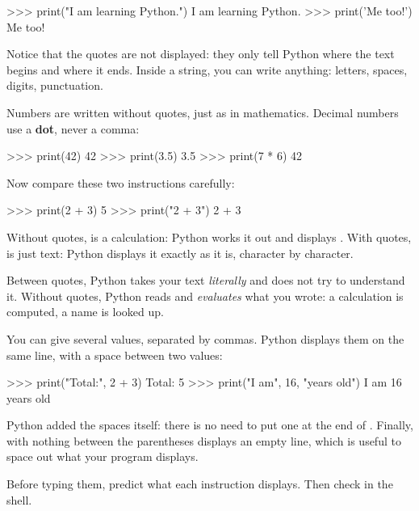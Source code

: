 \begin{console}
>>> print("I am learning Python.")
I am learning Python.
>>> print('Me too!')
Me too!
\end{console}

Notice that the quotes are not displayed: they only tell Python where the text begins and where it
ends. Inside a string, you can write anything: letters, spaces, digits, punctuation.

Numbers are written without quotes, just as in mathematics. Decimal numbers use a \textbf{dot},
never a comma:

\begin{console}
>>> print(42)
42
>>> print(3.5)
3.5
>>> print(7 * 6)
42
\end{console}

Now compare these two instructions carefully:

\begin{console}
>>> print(2 + 3)
5
>>> print("2 + 3")
2 + 3
\end{console}

Without quotes,  is a calculation: Python works it out and displays . With quotes,
 is just text: Python displays it exactly as it is, character by character.

\begin{regle}
Between quotes, Python takes your text \emph{literally} and does not try to understand it. Without
quotes, Python reads and \emph{evaluates} what you wrote: a calculation is computed, a name is looked
up.
\end{regle}

You can give  several values, separated by commas. Python displays them on the same
line, with a space between two values:

\begin{console}
>>> print("Total:", 2 + 3)
Total: 5
>>> print("I am", 16, "years old")
I am 16 years old
\end{console}

Python added the spaces itself: there is no need to put one at the end of . Finally,
 with nothing between the parentheses displays an empty line, which is useful to space
out what your program displays.

\begin{atoi}
Before typing them, predict what each instruction displays. Then check in the shell.\par\vspace{1mm}
\qquad{}\qquad{}\qquad{}
\end{atoi}

